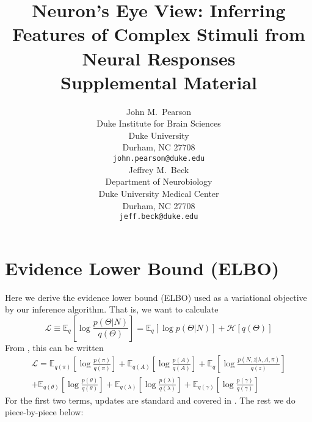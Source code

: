\documentclass{article} %
\title{Neuron's Eye View: Inferring Features of Complex Stimuli from Neural Responses\\Supplemental Material}
\author{
John M.~Pearson\\
Duke Institute for Brain Sciences \\
Duke University\\
Durham, NC 27708 \\
\texttt{john.pearson@duke.edu} \\
\And
Jeffrey M.~Beck \\
Department of Neurobiology \\
Duke University Medical Center \\
Durham, NC 27708 \\
\texttt{jeff.beck@duke.edu} \\
}
\begin{document}
\maketitle

\section{Evidence Lower Bound (ELBO)}
Here we derive the evidence lower bound (ELBO) used as a variational objective by our inference algorithm. That is, we want to calculate
\begin{equation}
    \mathcal{L} \equiv \mathbb{E}_q \left[\log \frac{p(\Theta|N)}{q(\Theta)} \right] = \mathbb{E}_q \left[\log p(\Theta|N) \right] + \mathcal{H}[q(\Theta)]
\end{equation}
From \cite{beal2003variational}, this can be written
\begin{multline}
    \mathcal{L} = \mathbb{E}_{q(\pi)} \left[\log \frac{p(\pi)}{q(\pi)} \right]
    + \mathbb{E}_{q(A)} \left[\log \frac{p(A)}{q(A)} \right]
    + \mathbb{E}_{q}\left[ \log \frac{p(N, z|\lambda, A, \pi)}{q(z)}\right] \\
    + \mathbb{E}_{q(\theta)} \left[\log \frac{p(\theta)}{q(\theta)} \right]
    + \mathbb{E}_{q(\lambda)} \left[\log \frac{p(\lambda)}{q(\lambda)} \right]
    + \mathbb{E}_{q(\gamma)} \left[\log \frac{p(\gamma)}{q(\gamma)} \right]
\end{multline}
For the first two terms, updates are standard and covered in \cite{beal2003variational}. The rest we do piece-by-piece below:
\end{document}
